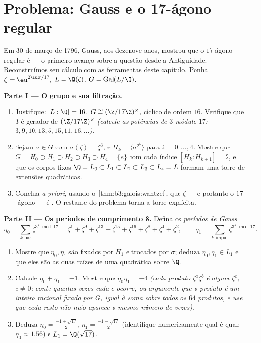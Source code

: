 \section{Problema: Gauss e o 17-ágono regular}

\begin{problem}\label{pb:b3:galois:1}
Em 30 de março de 1796, Gauss, aos dezenove anos, mostrou que o
$17$-ágono regular é  --- o primeiro avanço sobre a
questão desde a Antiguidade. Reconstruímos seu cálculo com as
ferramentas deste capítulo. Ponha $\zeta = \eu^{2\iu\pi/17}$, $L =
\Q(\zeta)$, $G = \operatorname{Gal}(L/\Q)$.

\medskip
\noindent\textbf{Parte I --- O grupo e sua filtração.}
\begin{enumerate}
  \item Justifique: $[L:\Q] = 16$, $G \cong (\Z/17\Z)^\times$, cíclico de ordem $16$.
        Verifique que $3$ é gerador de $(\Z/17\Z)^\times$ \emph{(calcule as
        potências de $3$ módulo $17$: $3, 9, 10, 13, 5, 15, 11, 16, \dots$)}.
  \item Sejam $\sigma \in G$ com $\sigma(\zeta) = \zeta^3$, e $H_k = \langle \sigma^{2^k}\rangle$ para $k = 0, \dots,
        4$. Mostre que $G = H_0 \supset H_1 \supset H_2 \supset
        H_3 \supset H_4 = \{e\}$
        com cada índice $[H_k :
        H_{k+1}] = 2$, e que os corpos fixos $\Q = L_0
        \subset L_1 \subset L_2 \subset L_3 \subset L_4 = L$ formam uma
        torre de extensões quadráticas.
  \item Conclua \emph{a priori}, usando o~\cref{thm:b3:galois:wantzel}, que
        $\zeta$ --- e portanto o $17$-ágono --- é .
        O restante do problema torna a torre explícita.
\end{enumerate}

\medskip
\noindent\textbf{Parte II --- Os períodos de comprimento 8.}
Defina os \emph{períodos de Gauss}
\[
\eta_0 = \sum_{k \text{ par}} \zeta^{3^k \bmod 17}
= \zeta^{1} + \zeta^{9} + \zeta^{13} + \zeta^{15} + \zeta^{16} +
\zeta^{8} + \zeta^{4} + \zeta^{2},
\qquad
\eta_1 = \sum_{k \text{ ímpar}} \zeta^{3^k \bmod 17}.
\]
\begin{enumerate}[resume]
  \item Mostre que $\eta_0, \eta_1$ são fixados por $H_1$ e trocados por
        $\sigma$; deduza $\eta_0, \eta_1 \in L_1$ e que eles são as duas raízes de
        uma quadrática sobre $\Q$.
  \item Calcule $\eta_0 + \eta_1 = -1$. Mostre que $\eta_0\eta_1 = -4$ \emph{(cada produto $\zeta^a\zeta^b$ é
        algum $\zeta^c$, $c \neq 0$; conte quantas vezes cada $c$ ocorre,
        ou argumente que o produto é um inteiro racional fixado por
        $G$, igual à soma sobre todos os $64$ produtos, e use
        que cada resto não nulo aparece o mesmo número de vezes)}.
  \item Deduza $\eta_0 = \frac{-1 + \sqrt{17}}2$, $\eta_1 =
        \frac{-1-\sqrt{17}}2$ (identifique numericamente qual é qual:
        $\eta_0 \approx 1.56$) e $L_1 =
        \Q(\sqrt{17})$.
\end{enumerate}


\end{problem}
